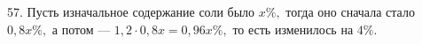 57. Пусть изначальное содержание соли было $x\%,$ тогда оно сначала стало $0,8x\%,$ а потом --- $1,2\cdot0,8x=0,96x\%,$ то есть изменилось на $4\%.$\\
